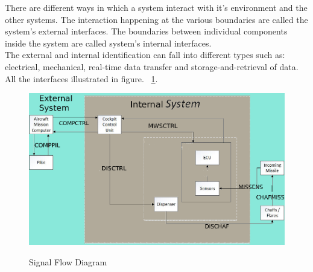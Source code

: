 There are different ways in which a system interact with it's environment and the other systems. The interaction happening at the various boundaries are called the system's external interfaces. The boundaries between individual components inside the system are called system's internal interfaces.\\
The external and internal identification can fall into different types such as: electrical, mechanical, real-time data transfer and storage-and-retrieval of data. All the interfaces illustrated in figure. ~\ref{fig:sigFlowDiagram}.
\begin{figure}[h]
	\centering
	\includegraphics[scale=0.5]{./images/SignalFlowDiagramDDD_v2}\\
	\caption{Signal Flow Diagram}
    \label{fig:sigFlowDiagram}
\end{figure}

